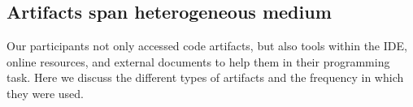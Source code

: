 





\subsection{Artifacts span heterogeneous medium}
Our participants not only accessed code artifacts, but also tools within the IDE, online resources, and external documents to help them in their programming task. Here we discuss the different types of artifacts and the frequency in which they were used.

